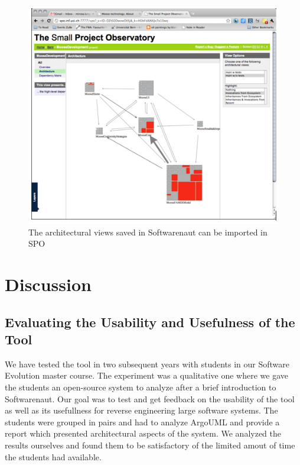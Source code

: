 \documentclass[preprint,12pt]{elsarticle}
\begin{document}
\begin{figure}[th!]
\begin{center}
\includegraphics[width=\linewidth]{images/SpoIntegration.png}
\caption{The architectural views saved in Softwarenaut can be imported in SPO}
\label{}
\end{center}
\end{figure}



\section {Discussion}
\label {sec:disc}
\subsection {Evaluating the Usability and Usefulness of the Tool}
We have tested the tool in two subsequent years with students in our Software Evolution master course. The experiment was a qualitative one where we gave the students an open-source system to analyze after a brief introduction to Softwarenaut. Our goal was to test and get feedback on the usability of the tool as well as its usefullness for reverse engineering large software systems. The students were grouped in pairs and had to analyze ArgoUML and provide a report which presented architectural aspects of the system. We analyzed the results ourselves and found them to be satisfactory of the limited amout of time the students had available. 
\end{document}
